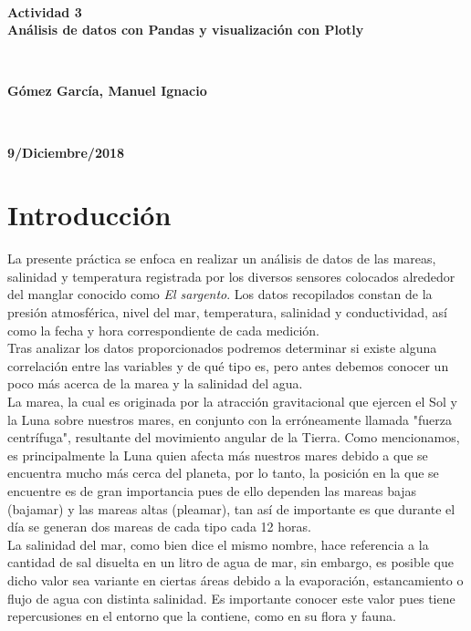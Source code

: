 \documentclass[12pt]{article}
\begin{document}
\begin{titlepage}
\HRule \\

{\huge \bfseries Actividad 3\\
Análisis de datos con Pandas y visualización con Plotly\\}

 \HRule \\ [1cm]
\vfill

\begin{minipage}{0.6\textwidth}
	\raggedright
	\large
	\textbf{Gómez García, Manuel Ignacio}
\end{minipage}
~
\begin{minipage}{0.35\textwidth}
	\raggedleft
	\large
	\textbf{9/Diciembre/2018}
\end{minipage}

\end{titlepage}

\section{Introducción}

\noindent La presente práctica se enfoca en realizar un análisis de datos de las mareas, salinidad y temperatura registrada por los diversos sensores colocados alrededor del manglar conocido como \textit{El sargento}. Los datos recopilados constan de la presión atmosférica, nivel del mar, temperatura, salinidad y conductividad, así como la fecha y hora correspondiente de cada medición. \\
\indent Tras analizar los datos proporcionados podremos determinar si existe alguna correlación entre las variables y de qué tipo es, pero antes debemos conocer un poco más acerca de la marea y la salinidad del agua. \\
\indent La marea, la cual es originada por la atracción gravitacional que ejercen el Sol y la Luna sobre nuestros mares, en conjunto con la erróneamente llamada "fuerza centrífuga", resultante del movimiento angular de la Tierra. Como mencionamos, es principalmente la Luna quien afecta más nuestros mares debido a que se encuentra mucho más cerca del planeta, por lo tanto, la posición en la que se encuentre es de gran importancia pues de ello dependen las mareas bajas (bajamar) y las mareas altas (pleamar), tan así de importante es que durante el día se generan dos mareas de cada tipo cada 12 horas. \\
\indent La salinidad del mar, como bien dice el mismo nombre, hace referencia a la cantidad de sal disuelta en un litro de agua de mar, sin embargo, es posible que dicho valor sea variante en ciertas áreas debido a la evaporación, estancamiento o flujo de agua con distinta salinidad. Es importante conocer este valor pues tiene repercusiones en el entorno que la contiene, como en su flora y fauna.
\end{document}
